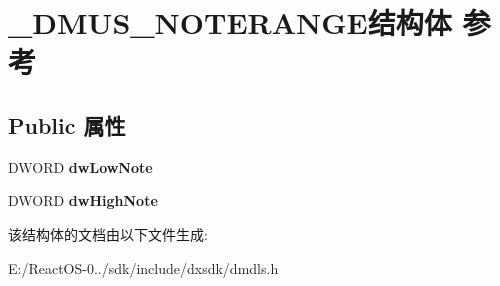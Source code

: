 \hypertarget{struct___d_m_u_s___n_o_t_e_r_a_n_g_e}{}\section{\+\_\+\+D\+M\+U\+S\+\_\+\+N\+O\+T\+E\+R\+A\+N\+G\+E结构体 参考}
\label{struct___d_m_u_s___n_o_t_e_r_a_n_g_e}
\subsection*{Public 属性}
\begin{DoxyCompactItemize}
\item 
\mbox{\label{struct___d_m_u_s___n_o_t_e_r_a_n_g_e_ae1fff19f3bb3f436950dc77f7d4dcf6d}} 
D\+W\+O\+RD {\bfseries dw\+Low\+Note}
\item 
\mbox{\label{struct___d_m_u_s___n_o_t_e_r_a_n_g_e_a29e0a57c4179c691f287d610b0c7f914}} 
D\+W\+O\+RD {\bfseries dw\+High\+Note}
\end{DoxyCompactItemize}


该结构体的文档由以下文件生成\+:\begin{DoxyCompactItemize}
\item 
E\+:/\+React\+O\+S-\/0../sdk/include/dxsdk/dmdls.\+h\end{DoxyCompactItemize}
